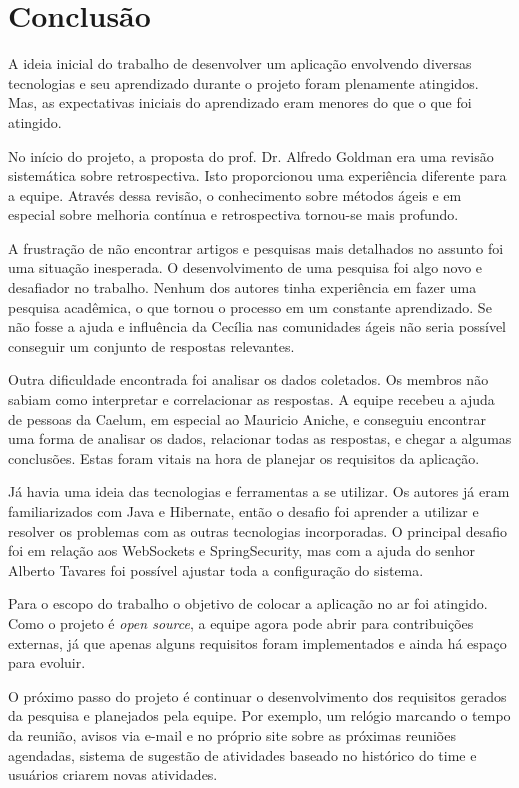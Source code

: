 \section{Conclusão}

A ideia inicial do trabalho de desenvolver um aplicação envolvendo diversas tecnologias e seu aprendizado durante o projeto foram plenamente atingidos. Mas, as expectativas iniciais do aprendizado eram menores do que o que foi atingido.

No início do projeto, a proposta do prof. Dr. Alfredo Goldman era uma revisão sistemática sobre retrospectiva. Isto proporcionou uma experiência diferente para a equipe. Através dessa revisão, o conhecimento sobre métodos ágeis e em especial sobre melhoria contínua e retrospectiva tornou-se mais profundo.

A frustração de não encontrar artigos e pesquisas mais detalhados no assunto foi uma situação inesperada. O desenvolvimento de uma pesquisa foi algo novo e desafiador no trabalho. Nenhum dos autores tinha experiência em fazer uma pesquisa acadêmica, o que tornou o processo em um constante aprendizado. Se não fosse a ajuda e influência da Cecília nas comunidades ágeis não seria possível conseguir um conjunto de respostas relevantes.

Outra dificuldade encontrada foi analisar os dados coletados. Os membros não sabiam como interpretar e correlacionar as respostas. A equipe recebeu a ajuda de pessoas da Caelum, em especial ao Mauricio Aniche, e conseguiu encontrar uma forma de analisar os dados, relacionar todas as respostas, e chegar a algumas conclusões. Estas foram vitais na hora de planejar os requisitos da aplicação.

Já havia uma ideia das tecnologias e ferramentas a se utilizar. Os autores já eram familiarizados com Java e Hibernate, então o desafio foi aprender a utilizar e resolver os problemas com as outras tecnologias incorporadas. O principal desafio foi em relação aos WebSockets e SpringSecurity, mas com a ajuda do senhor Alberto Tavares foi possível ajustar toda a configuração do sistema. 

Para o escopo do trabalho o objetivo de colocar a aplicação no ar foi atingido. Como o projeto é \textit{open source}, a equipe agora pode abrir para contribuições externas, já que apenas alguns requisitos foram implementados e ainda há espaço para evoluir.  

O próximo passo do projeto é continuar o desenvolvimento dos requisitos gerados da pesquisa e planejados pela equipe. Por exemplo, um relógio marcando o tempo da reunião, avisos via e-mail e no próprio site sobre as próximas reuniões agendadas, sistema de sugestão de atividades baseado no histórico do time e  usuários criarem novas atividades.

